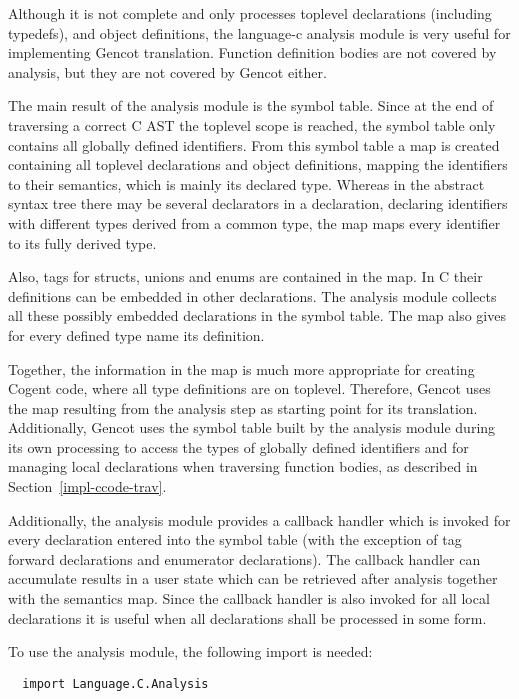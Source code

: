 Although it is not complete and only processes toplevel declarations (including typedefs), and object definitions, the
language-c analysis module is very
useful for implementing Gencot translation. Function definition bodies are not covered by analysis, but they are
not covered by Gencot either.

The main result of the analysis module is the symbol table. Since at the end of traversing a correct C AST the toplevel
scope is reached, the symbol table only contains all globally defined identifiers. From this symbol table 
a map is created containing all toplevel declarations and object definitions, mapping the identifiers
to their semantics, which is mainly its declared type. Whereas in the abstract syntax tree there may be several declarators
in a declaration, declaring identifiers with different types derived from a common type, the map maps every identifier
to its fully derived type. 

Also, tags for structs, unions and enums are contained in the map. In C their definitions can be embedded in other declarations.
The analysis module collects all these possibly embedded declarations in the symbol table. The map also gives for
every defined type name its definition.

Together, the information in the map is much more appropriate for creating Cogent code, where all type definitions are on
toplevel. Therefore, Gencot uses the map resulting from the analysis step as starting point for its translation. 
Additionally, Gencot uses the symbol table built by the analysis module during its own processing to access the
types of globally defined identifiers and for managing local declarations when traversing function bodies, as described in
Section~\ref{impl-ccode-trav}.

Additionally, the analysis module provides a callback handler which is invoked for every declaration entered into the symbol 
table (with the exception of tag forward declarations and enumerator declarations). The callback handler can accumulate results 
in a user state which can be retrieved after analysis together with the
semantics map. Since the callback handler is also invoked for all local declarations it is useful when all declarations
shall be processed in some form.

To use the analysis module, the following import is needed:
\begin{verbatim}
  import Language.C.Analysis
\end{verbatim}

